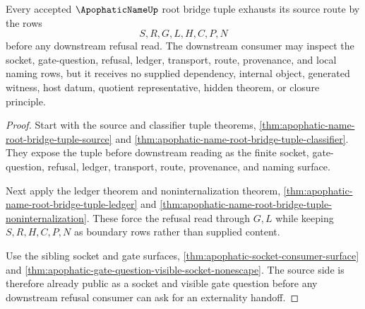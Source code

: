 \begin{theorem}
\label{thm:apophatic-name-root-bridge-tuple-source-route-totality}
Every accepted $\ApophaticNameUp$ root bridge tuple exhausts its source route by the rows
$$
S,R,G,L,H,C,P,N
$$
before any downstream refusal read. The downstream consumer may inspect the socket, gate-question, refusal, ledger, transport, route, provenance, and local naming rows, but it receives no supplied dependency, internal object, generated witness, host datum, quotient representative, hidden theorem, or closure principle.
\end{theorem}
\begin{proof}
Start with the source and classifier tuple theorems, \autoref{thm:apophatic-name-root-bridge-tuple-source} and \autoref{thm:apophatic-name-root-bridge-tuple-classifier}. They expose the tuple before downstream reading as the finite socket, gate-question, refusal, ledger, transport, route, provenance, and naming surface.

Next apply the ledger theorem and noninternalization theorem, \autoref{thm:apophatic-name-root-bridge-tuple-ledger} and \autoref{thm:apophatic-name-root-bridge-tuple-noninternalization}. These force the refusal read through $G,L$ while keeping $S,R,H,C,P,N$ as boundary rows rather than supplied content.

Use the sibling socket and gate surfaces, \autoref{thm:apophatic-socket-consumer-surface} and \autoref{thm:apophatic-gate-question-visible-socket-nonescape}. The source side is therefore already public as a socket and visible gate question before any downstream refusal consumer can ask for an externality handoff.
\end{proof}

